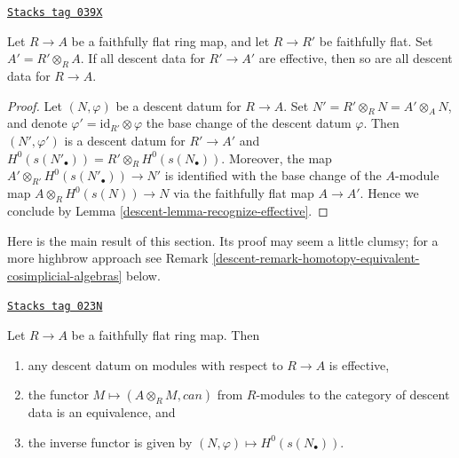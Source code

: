 \begin{lemma}
\label{descent-lemma-descent-descends}
\href{https://stacks.math.columbia.edu/tag/039X}{\texttt{Stacks tag 039X}}

Let $R \to A$ be a faithfully flat ring map, and let $R \to R'$
be faithfully flat. Set $A' = R' \otimes_R A$. If all descent data
for $R' \to A'$ are effective, then so are all descent data for $R \to A$.
\end{lemma}

\begin{proof}

Let $(N, \varphi)$ be a descent datum for $R \to A$.
Set $N' = R' \otimes_R N = A' \otimes_A N$, and denote
$\varphi' = \text{id}_{R'} \otimes \varphi$ the base change
of the descent datum $\varphi$. Then $(N', \varphi')$ is
a descent datum for $R' \to A'$ and
$H^0(s(N'_\bullet)) = R' \otimes_R H^0(s(N_\bullet))$.
Moreover, the map
$A' \otimes_{R'} H^0(s(N'_\bullet)) \to N'$ is identified
with the base change of the $A$-module map
$A \otimes_R H^0(s(N)) \to N$ via the faithfully flat map
$A \to A'$. Hence we conclude by Lemma \ref{descent-lemma-recognize-effective}.
\end{proof}

Here is the main result of this section.
Its proof may seem a little clumsy; for a more highbrow approach see
Remark \ref{descent-remark-homotopy-equivalent-cosimplicial-algebras} below.

\begin{proposition}
\label{descent-proposition-descent-module}
\href{https://stacks.math.columbia.edu/tag/023N}{\texttt{Stacks tag 023N}}


Let $R \to A$ be a faithfully flat ring map.
Then
\begin{enumerate}
\item any descent datum on modules with respect to $R \to A$
is effective,
\item the functor $M \mapsto (A \otimes_R M, can)$ from $R$-modules
to the category of descent data is an equivalence, and
\item the inverse functor is given by $(N, \varphi) \mapsto H^0(s(N_\bullet))$.
\end{enumerate}
\end{proposition}

